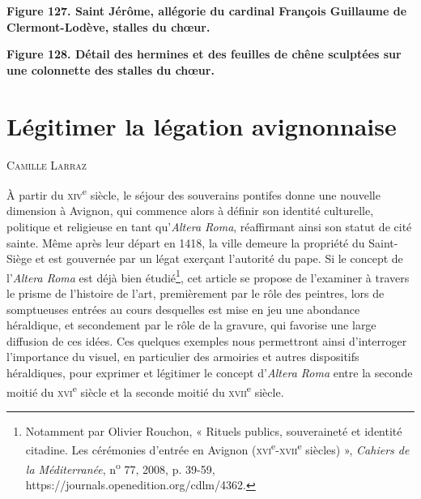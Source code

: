 \documentclass[12pt,twoside,openany]{book}
\newcommand{\PurhContributors}[1]{%
  \par\vspace{0.5\baselineskip}%
  {\normalsize\scshape #1\par}%
  \vspace{0.6\baselineskip}%
}
\begin{document}
\begin{center}
\par\small \textbf{Figure 127. Saint Jérôme, allégorie du cardinal François Guillaume de Clermont-Lodève, stalles du chœur.}
\end{center}

\begin{center}
\par\small \textbf{Figure 128. Détail des hermines et des feuilles de chêne sculptées sur une colonnette des stalles du chœur.}
\end{center}

\chapter{Légitimer la légation avignonnaise}

\PurhContributors{Camille Larraz}

À partir du \textsc{xiv}\textsuperscript{e} siècle, le séjour des souverains pontifes donne une nouvelle dimension à Avignon, qui commence alors à définir son identité culturelle, politique et religieuse en tant qu’\textit{Altera Roma}, réaffirmant ainsi son statut de cité sainte. Même après leur départ en 1418, la ville demeure la propriété du Saint-Siège et est gouvernée par un légat exerçant l’autorité du pape. Si le concept de l’\textit{Altera Roma} est déjà bien étudié\footnote{Notamment par Olivier Rouchon, « Rituels publics, souveraineté et identité citadine. Les cérémonies d’entrée en Avignon (\textsc{xvi}\textsuperscript{e}-\textsc{xvii}\textsuperscript{e} siècles) », \textit{Cahiers de la Méditerranée}, n\textsuperscript{o} 77, 2008, p. 39-59, https://journals.openedition.org/cdlm/4362.}, cet article se propose de l’examiner à travers le prisme de l’histoire de l’art, premièrement par le rôle des peintres, lors de somptueuses entrées au cours desquelles est mise en jeu une abondance héraldique, et secondement par le rôle de la gravure, qui favorise une large diffusion de ces idées. Ces quelques exemples nous permettront ainsi d’interroger l’importance du visuel, en particulier des armoiries et autres dispositifs héraldiques, pour exprimer et légitimer le concept d’\textit{Altera Roma} entre la seconde moitié du \textsc{xvi}\textsuperscript{e} siècle et la seconde moitié du \textsc{xvii}\textsuperscript{e} siècle.
\end{document}
